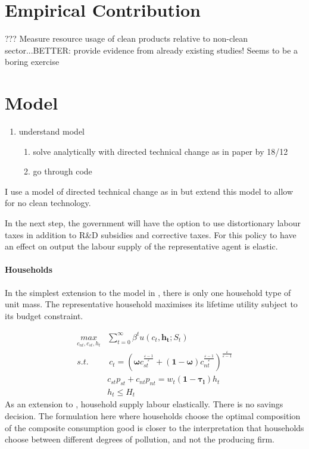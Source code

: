 \documentclass[12pt]{article}
\begin{document}
\section{Empirical Contribution}

???
Measure resource usage of clean products relative to non-clean sector...BETTER: provide evidence from already existing studies! Seems to be a boring exercise


\section{Model}
\begin{enumerate}
\item understand model
\begin{enumerate}
\item solve analytically with directed technical change as in paper
by 18/12
\item go through code
\end{enumerate}
\end{enumerate}

I use a model of directed technical change as in \cite{Acemoglu2012TheChange} but extend this model to allow for no clean technology. 

In the next step, the government will have the option to use distortionary labour taxes in addition to R\&D subsidies and corrective taxes. For this policy to have an effect on output the labour supply of the representative agent is elastic.
 


\paragraph{Households}
In the simplest extension to the model in \cite{Acemoglu2012TheChange}, there is only one household type of unit mass. The representative household maximises its lifetime utility subject to its budget constraint. 

\begin{align*}
\underset{c_{nt}, c_{st}, h_t}{max}&\sum_{t=0}^{\infty}\beta^t u(c_t, \pmb{h_t}; S_t)\\
s.t.& \ c_t= \left(\pmb{\omega} c_{st}^{\frac{\varepsilon-1}{\varepsilon}} +(\pmb{1-\omega})c_{nt}^\frac{\varepsilon-1}{\varepsilon}\right)^\frac{\varepsilon}{\varepsilon-1}\\
& c_{st}p_{st}+c_{nt}p_{nt}=w_t\pmb{(1-\tau_l)}h_t\\
& h_t\leq H_t
\end{align*}
As an extension to \cite{Acemoglu2012TheChange}, household supply labour elastically. There is no savings decision. 
 The formulation here where households choose the optimal composition of the composite consumption good is closer to the interpretation that households choose between different degrees of pollution, and not the producing firm. 
\end{document}
